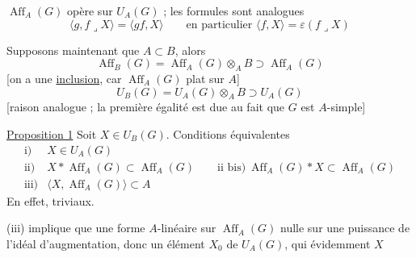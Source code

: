 $\operatorname{Aff}_A(G)$ opère  sur $U_A(G)$ ; les formules sont  analogues
\[
\langle g,f\mathbin{\lrcorner}X\rangle=\langle gf,X\rangle
\qquad\text{en particulier }\langle f,X\rangle=\varepsilon(f\mathbin{\lrcorner}X)
\]

Supposons maintenant que $A\subset B$, alors
\[
\operatorname{Aff}_B(G)=\operatorname{Aff}_A(G)\otimes_A B\supset\operatorname{Aff}_A(G)
\]
[on a une \uline{inclusion}, car $\operatorname{Aff}_A(G)$ plat sur $A$]
\[
U_B(G)=U_A(G)\otimes_A B\supset U_A(G)
\]
[raison analogue ; la première égalité est due au fait que $G$ est $A$-simple]

\uline{Proposition 1} Soit $X\in U_B(G)$. Conditions équivalentes
\[
\begin{array}{ll}
\text{i)}&X\in U_A(G)\\
\text{ii)}&X*\operatorname{Aff}_A(G)\subset\operatorname{Aff}_A(G)
\qquad\text{ii bis)}\ \operatorname{Aff}_A(G)*X\subset\operatorname{Aff}_A(G)\\
\text{iii)}&\langle X,\operatorname{Aff}_A(G)\rangle\subset A
\end{array}
\]
En effet,
triviaux.

(iii) implique que    une forme $A$-linéaire sur $\operatorname{Aff}_A(G)$ nulle sur une puissance de l'idéal d'augmentation, donc un élément $X_0$ de $U_A(G)$, qui  évidemment  $X$
